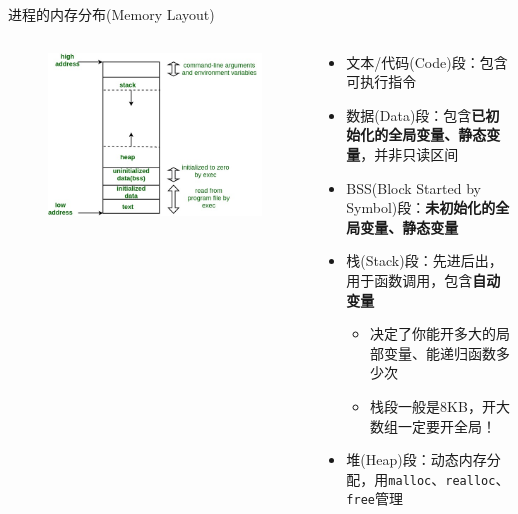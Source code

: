 \documentclass{myslide}
\begin{document}
\begin{frame}[fragile]{进程的内存分布(Memory Layout)}
\begin{columns}
\begin{column}{0.4\linewidth}
\begin{figure}
\centering
\includegraphics[width=1.1\linewidth]{fig/memoryLayoutC.jpg}
\end{figure}
\end{column}
\begin{column}{0.6\linewidth}
\begin{itemize}[<+->]
	\item 文本/代码(Code)段：包含可执行指令
	\item 数据(Data)段：包含\textbf{已初始化的全局变量、静态变量}，并非只读区间
	\item BSS(Block Started by Symbol)段：\textbf{未初始化的全局变量、静态变量}
	\item 栈(Stack)段：先进后出，用于函数调用，包含\textbf{自动变量}
	\begin{itemize}
		\item 决定了你能开多大的局部变量、能递归函数多少次
		\item 栈段一般是8KB，开大数组一定要开全局！
	\end{itemize}
	\item 堆(Heap)段：动态内存分配，用\verb'malloc'、\verb'realloc'、\verb'free'管理
\end{itemize}
\end{column}
\end{columns}
\end{frame}
\end{document}
